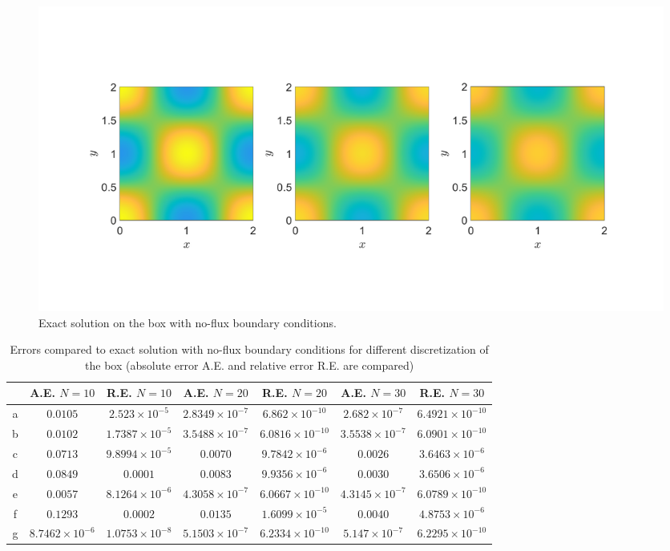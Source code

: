 \documentclass[11pt, a4paper]{article}
\theoremstyle{definition}
\begin{document}
\begin{figure}[h]
	\centering
	\includegraphics[scale=0.35]{boxExNoFlux.png}
	\caption{Exact solution on the box with no-flux boundary conditions.} 
	\label{F3b}
\end{figure}
\begin{table}
	\caption{Errors compared to exact solution with no-flux boundary conditions for different discretization of the box (absolute error A.E. and relative error R.E. are compared)}
	\begin{tabular}{ ||c| c| c| c| c |c|c|| }
		\hline
		\hline
		& A.E. $N =10$ & R.E. $N =10$ &A.E. $N =20$ & R.E. $N =20$ &A.E. $N =30$ & R.E. $N =30$ \\ 
		\hline
		a & $0.0105$ & $2.523 \times 10^{-5}$ & $2.8349\times 10^{-7}$ & $6.862\times 10^{-10}$ & $2.682\times 10^{-7}$ & $6.4921\times 10^{-10}$\\  
		b & $0.0102$ & $1.7387\times 10^{-5}$ & $3.5488\times 10^{-7}$ & $6.0816\times 10^{-10}$ & $3.5538\times 10^{-7}$ & $6.0901\times 10^{-10}$\\  
		c & $0.0713$ & $9.8994 \times 10^{-5}$ & $0.0070$ & $9.7842\times 10^{-6}$ & $0.0026$ & $3.6463\times 10^{-6}$\\  
		d & $0.0849$ & $0.0001               $ & $0.0083$ & $9.9356\times 10^{-6}$ & $0.0030$ & $3.6506\times 10^{-6}$\\  
		e & $0.0057$ & $8.1264 \times 10^{-6}$ & $4.3058\times 10^{-7}$ & $6.0667\times 10^{-10}$ & $4.3145\times 10^{-7}$ & $6.0789\times 10^{-10}$\\  
		f & $0.1293$ & $0.0002$ & $0.0135$ & $1.6099\times 10^{-5}$ & $0.0040$ & $4.8753\times 10^{-6}$\\  
		g & $8.7462 \times 10^{-6}$ & $1.0753\times 10^{-8}$ & $5.1503\times 10^{-7}$ & $6.2334\times 10^{-10}$ & $5.147\times 10^{-7}$ & $6.2295\times 10^{-10}$\\  
		\hline
		\hline
	\end{tabular}
	\label{Tab3:ErrorsNoFlux}
\end{table}
\end{document}
